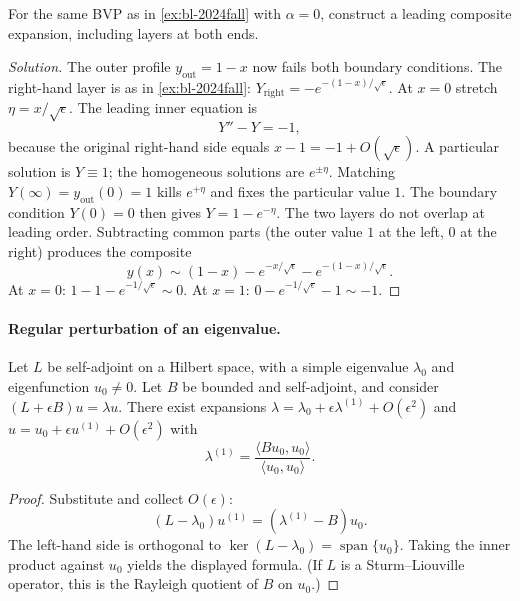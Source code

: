 \documentclass[11pt,a4paper]{article}
\begin{document}
\begin{exercise}[2024 Fall Problem~6, \(\alpha=0\)]
\label{exer:bl-2024-alpha0}
For the same BVP as in \cref{ex:bl-2024fall} with \(\alpha=0\), construct a leading composite expansion, including layers at both ends.
\end{exercise}

\begin{proof}[Solution]
The outer profile \(y_{\mathrm{out}}=1-x\) now fails both boundary conditions. The right-hand layer is as in \cref{ex:bl-2024fall}: \(Y_{\mathrm{right}}=-e^{-(1-x)/\sqrt{\epsilon}}\). At \(x=0\) stretch \(\eta=x/\sqrt{\epsilon}\). The leading inner equation is
\[
Y''-Y
=
-1,
\]
because the original right-hand side equals \(x-1=-1+O(\sqrt{\epsilon})\). A particular solution is \(Y\equiv 1\); the homogeneous solutions are \(e^{\pm\eta}\). Matching \(Y(\infty)=y_{\mathrm{out}}(0)=1\) kills \(e^{+\eta}\) and fixes the particular value \(1\). The boundary condition \(Y(0)=0\) then gives \(Y=1-e^{-\eta}\). The two layers do not overlap at leading order. Subtracting common parts (the outer value \(1\) at the left, \(0\) at the right) produces the composite
\[
y(x)
\sim
(1-x)-e^{-x/\sqrt{\epsilon}}-e^{-(1-x)/\sqrt{\epsilon}}.
\]
At \(x=0\): \(1-1-e^{-1/\sqrt{\epsilon}}\sim 0\). At \(x=1\): \(0-e^{-1/\sqrt{\epsilon}}-1\sim -1\).
\end{proof}

\paragraph{Regular perturbation of an eigenvalue.}

\begin{theorem}
\label{thm:eig-regular}
Let \(L\) be self-adjoint on a Hilbert space, with a simple eigenvalue \(\lambda_{0}\) and eigenfunction \(u_{0}\neq 0\). Let \(B\) be bounded and self-adjoint, and consider \((L+\epsilon B)u=\lambda u\). There exist expansions \(\lambda=\lambda_{0}+\epsilon\lambda^{(1)}+O(\epsilon^{2})\) and \(u=u_{0}+\epsilon u^{(1)}+O(\epsilon^{2})\) with
\[
\lambda^{(1)}
=
\frac{\langle Bu_{0},u_{0}\rangle}{\langle u_{0},u_{0}\rangle}.
\]
\end{theorem}

\begin{proof}
Substitute and collect \(O(\epsilon)\):
\[
(L-\lambda_{0})u^{(1)}
=
(\lambda^{(1)}-B)u_{0}.
\]
The left-hand side is orthogonal to \(\ker(L-\lambda_{0})=\operatorname{span}\{u_{0}\}\). Taking the inner product against \(u_{0}\) yields the displayed formula. (If \(L\) is a Sturm--Liouville operator, this is the Rayleigh quotient of \(B\) on \(u_{0}\).)
\end{proof}
\end{document}
